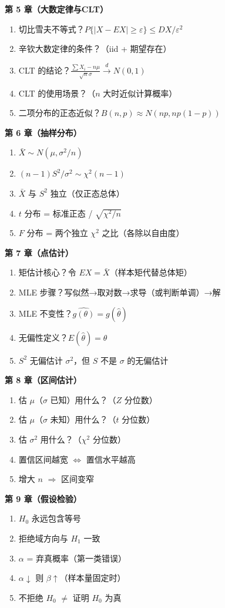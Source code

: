 ﻿\documentclass[lang=cn,11pt]{elegantbook}
\begin{document}
\begin{note}
\textbf{第 5 章（大数定律与CLT）}
\begin{enumerate}
    \item 切比雪夫不等式？$P\{|X-EX|\geq\varepsilon\}\leq DX/\varepsilon^2$
    \item 辛钦大数定律的条件？（iid + 期望存在）
    \item CLT 的结论？$\frac{\sum X_i - n\mu}{\sqrt{n}\sigma}\xrightarrow{d}N(0,1)$
    \item CLT 的使用场景？（$n$ 大时近似计算概率）
    \item 二项分布的正态近似？$B(n,p)\approx N(np,np(1-p))$
\end{enumerate}

\textbf{第 6 章（抽样分布）}
\begin{enumerate}
    \item $\bar X\sim N(\mu,\sigma^2/n)$
    \item $(n-1)S^2/\sigma^2\sim\chi^2(n-1)$
    \item $\bar X$ 与 $S^2$ 独立（仅正态总体）
    \item $t$ 分布 = 标准正态 / $\sqrt{\chi^2/n}$
    \item $F$ 分布 = 两个独立 $\chi^2$ 之比（各除以自由度）
\end{enumerate}

\textbf{第 7 章（点估计）}
\begin{enumerate}
    \item 矩估计核心？令 $EX=\bar X$（样本矩代替总体矩）
    \item MLE 步骤？写似然→取对数→求导（或判断单调）→解
    \item MLE 不变性？$\widehat{g(\theta)}=g(\hat\theta)$
    \item 无偏性定义？$E(\hat\theta)=\theta$
    \item $S^2$ 无偏估计 $\sigma^2$，但 $S$ 不是 $\sigma$ 的无偏估计
\end{enumerate}

\textbf{第 8 章（区间估计）}
\begin{enumerate}
    \item 估 $\mu$（$\sigma$ 已知）用什么？（$Z$ 分位数）
    \item 估 $\mu$（$\sigma$ 未知）用什么？（$t$ 分位数）
    \item 估 $\sigma^2$ 用什么？（$\chi^2$ 分位数）
    \item 置信区间越宽 $\Leftrightarrow$ 置信水平越高
    \item 增大 $n$ $\Rightarrow$ 区间变窄
\end{enumerate}

\textbf{第 9 章（假设检验）}
\begin{enumerate}
    \item $H_0$ 永远包含等号
    \item 拒绝域方向与 $H_1$ 一致
    \item $\alpha$ = 弃真概率（第一类错误）
    \item $\alpha\downarrow$ 则 $\beta\uparrow$（样本量固定时）
    \item 不拒绝 $H_0$ $\neq$ 证明 $H_0$ 为真
\end{enumerate}
\end{note}
\end{document}
